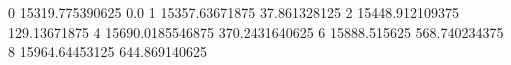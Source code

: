 0 15319.775390625 0.0
1 15357.63671875 37.861328125
2 15448.912109375 129.13671875
4 15690.0185546875 370.2431640625
6 15888.515625 568.740234375
8 15964.64453125 644.869140625
